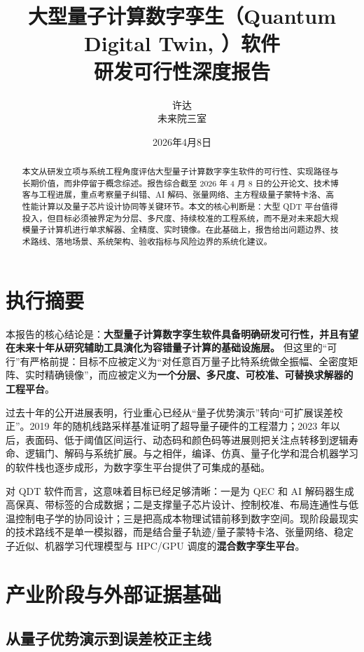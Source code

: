 \documentclass[11pt,a4paper]{article}
\title{\textbf{大型量子计算数字孪生（Quantum Digital Twin, \QDT）软件\\研发可行性深度报告}}
\author{许达\\未来院三室}
\date{2026年4月8日}
\newcommand{\QDT}{QDT}
\newcommand{\QEC}{QEC}
\begin{document}
\maketitle
\begin{abstract}
本文从研发立项与系统工程角度评估大型量子计算数字孪生软件的可行性、实现路径与长期价值，而非停留于概念综述。报告综合截至 2026 年 4 月 8 日的公开论文、技术博客与工程进展，重点考察量子纠错、AI 解码、张量网络、主方程级量子蒙特卡洛、高性能计算以及量子芯片设计协同等关键环节。本文的核心判断是：大型 \QDT{} 平台值得投入，但目标必须被界定为分层、多尺度、持续校准的工程系统，而不是对未来超大规模量子计算机进行单求解器、全精度、实时镜像。在此基础上，报告给出问题边界、技术路线、落地场景、系统架构、验收指标与风险边界的系统化建议。
\end{abstract}
\tableofcontents
\newpage

\section{执行摘要}

本报告的核心结论是：\textbf{大型量子计算数字孪生软件具备明确研发可行性，并且有望在未来十年从研究辅助工具演化为容错量子计算的基础设施层。} 但这里的“可行”有严格前提：目标不应被定义为“对任意百万量子比特系统做全振幅、全密度矩阵、实时精确镜像”，而应被定义为\textbf{一个分层、多尺度、可校准、可替换求解器的工程平台}。

过去十年的公开进展表明，行业重心已经从“量子优势演示”转向“可扩展误差校正”。2019 年的随机线路采样基准证明了超导量子硬件的工程潜力；2023 年以后，表面码、低于阈值区间运行、动态码和颜色码等进展则把关注点转移到逻辑寿命、逻辑门、解码与系统扩展。与之相伴，编译、仿真、量子化学和混合机器学习的软件栈也逐步成形，为数字孪生平台提供了可集成的基础。

对 \QDT{} 软件而言，这意味着目标已经足够清晰：一是为 \QEC{} 和 AI 解码器生成高保真、带标签的合成数据；二是支撑量子芯片设计、控制校准、布局连通性与低温控制电子学的协同设计；三是把高成本物理试错前移到数字空间。现阶段最现实的技术路线不是单一模拟器，而是结合量子轨迹/量子蒙特卡洛、张量网络、稳定子近似、机器学习代理模型与 HPC/GPU 调度的\textbf{混合数字孪生平台}。

\section{产业阶段与外部证据基础}

\subsection{从量子优势演示到误差校正主线}
\end{document}
